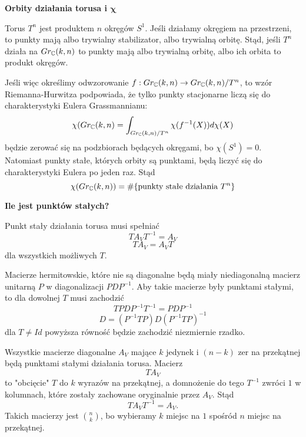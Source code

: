 \textbf{\color{green}Orbity działania torusa i $\boldsymbol{\chi}$}

Torus $T^n$ jest produktem $n$ okręgów $S^1$. Jeśli działamy okręgiem na przestrzeni, to punkty mają albo trywialny stabilizator, albo trywialną orbitę. Stąd, jeśli $T^n$ działa na $Gr_{\operatorname{\mathbb{C}}}(k,n)$ to punkty mają albo trywialną orbitę, albo ich orbita to produkt okręgów.

Jeśli więc określimy odwzorowanie $f:Gr_{\operatorname{\mathbb{C}}}(k,n)\to Gr_{\operatorname{\mathbb{C}}}(k,n)/T^n$, to wzór Riemanna-Hurwitza podpowiada, że tylko punkty stacjonarne liczą się do charakterystyki Eulera Grassmannianu:
$$\chi(Gr_{\operatorname{\mathbb{C}}}(k,n)=\int_{Gr_{\operatorname{\mathbb{C}}}(k,n)/T^n}\chi(f^{-1}(X))d\chi(X)$$
będzie zerować się na podzbiorach będących okręgami, bo $\chi(S^1)=0$. Natomiast punkty stałe, których orbity są punktami, będą liczyć się do charakterystyki Eulera po jeden raz. Stąd
$$\chi( Gr_{\operatorname{\mathbb{C}}}(k,n))=\#\{\text{punkty stałe działania }T^n\}$$

\textbf{\color{green}Ile jest punktów stałych?}

Punkt stały działania torusa musi spełniać
$$TA_VT^{-1}=A_V$$
$$TA_V=A_VT$$
dla wszystkich możliwych $T$.

Macierze hermitowskie, które nie są diagonalne będą miały niediagonalną macierz unitarną $P$ w diagonalizacji $PDP^{-1}$. Aby takie macierze były punktami stałymi, to dla dowolnej $T$ musi zachodzić
$$TPDP^{-1}T^{-1}=PDP^{-1}$$
$$D=(P^{-1}TP)D(P^{-1}TP)^{-1}$$
dla $T\neq Id$ powyższa równość będzie zachodzić niezmiernie rzadko. 

Wszystkie macierze diagonalne $A_V$ mające $k$ jedynek i $(n-k)$ zer na przekątnej będą punktami stałymi działania torusa. Macierz 
$$TA_V$$ 
to "obcięcie" $T$ do $k$ wyrazów na przekątnej, a domnożenie do tego $T^{-1}$ zwróci $1$ w kolumnach, które zostały zachowane oryginalnie przez $A_V$. Stąd 
$$TA_VT^{-1}=A_V.$$
Takich macierzy jest $\binom{n}{k}$, bo wybieramy $k$ miejsc na $1$ spośród $n$ miejsc na przekątnej.
